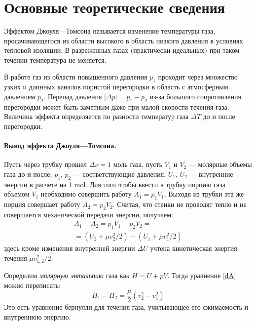 \documentclass[a4paper,12pt]{report}
\begin{document}
    \section{Основные теоретические сведения}
    \begin{multicols}{2}
        Эффектом Джоуля---Томсона называется изменение температуры газа, просачивающегося из области высокого в область низкого давления в условиях тепловой изоляции. В разреженных газах (практически идеальных) при таком течении температура не меняется.

        В работе газ из области повышенного давления $p_1$ проходит через множество узких и длинных каналов пористой перегородки в область с атмосферным давлением $p_2$. Перепад давления $|\Delta p|=p_1-p_2$ из-за большого сопротивления перегородки может быть заметным даже при малой скорости течения газа. Величина эффекта определяется по разности температур газа $\Delta T$ до и после перегородки.

        \paragraph*{Вывод эффекта Джоуля---Томсона.} Пусть через трубку прошел $\Delta \nu = 1$ моль газа, пусть $V_1$ и $V_2$ --- молярные объемы газа до и после, $p_1$, $p_2$ --- соответствующие давления. $U_1$, $U_2$ --- внутренние энергии в расчете на 1 mol. Для того чтобы ввести в трубку порцию газа объемом $V_1$ необходимо совершить работу $A_1=p_1V_1$. Выходя из трубки эта же порция совершает работу $A_2=p_2V_2$. Считая, что стенки не проводят тепло и не совершается механической передачи энергии, получаем:
        \begin{align}
            A_1-A_2=p_1V_1-p_2V_2=\nonumber\\
            =(U_2+\mu v_2^2/2)-(U_1+\mu v_1^2/2)
            \label{dA}
        \end{align}
        здесь кроме изменения внутренней энергии $\Delta U$ учтена кинетическая энергия течения $\mu v_{1,2}^2/2$.

        Определим \emph{молярную энтальпию} газа как $H=U+pV$. Тогда уравнение \eqref{dA} можно переписать:
        \begin{equation}
            H_1-H_2=\frac{\mu}{2}(v_2^2-v_1^2)
            \label{dH}
        \end{equation}
        Это есть уравнение бернулли для течения газа, учитывающее его сжимаемость и внутреннюю энергию.
        

\end{multicols}
\end{document}
